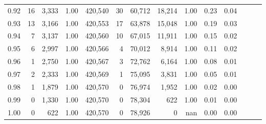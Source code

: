 \begin{tabular}{rrrrrrrrrrrrrr}
0.92 &     16 &  3,333 &  1.00 &  420,540 &       30 &  60,712 &  18,214 &  1.00 &  0.23 &      0.04 \\
0.93 &     13 &  3,166 &  1.00 &  420,553 &       17 &  63,878 &  15,048 &  1.00 &  0.19 &      0.03 \\
0.94 &      7 &  3,137 &  1.00 &  420,560 &       10 &  67,015 &  11,911 &  1.00 &  0.15 &      0.02 \\
0.95 &      6 &  2,997 &  1.00 &  420,566 &        4 &  70,012 &   8,914 &  1.00 &  0.11 &      0.02 \\
0.96 &      1 &  2,750 &  1.00 &  420,567 &        3 &  72,762 &   6,164 &  1.00 &  0.08 &      0.01 \\
0.97 &      2 &  2,333 &  1.00 &  420,569 &        1 &  75,095 &   3,831 &  1.00 &  0.05 &      0.01 \\
0.98 &      1 &  1,879 &  1.00 &  420,570 &        0 &  76,974 &   1,952 &  1.00 &  0.02 &      0.00 \\
0.99 &      0 &  1,330 &  1.00 &  420,570 &        0 &  78,304 &     622 &  1.00 &  0.01 &      0.00 \\
1.00 &      0 &    622 &  1.00 &  420,570 &        0 &  78,926 &       0 &   nan &  0.00 &      0.00 \\
\bottomrule
\end{tabular}
